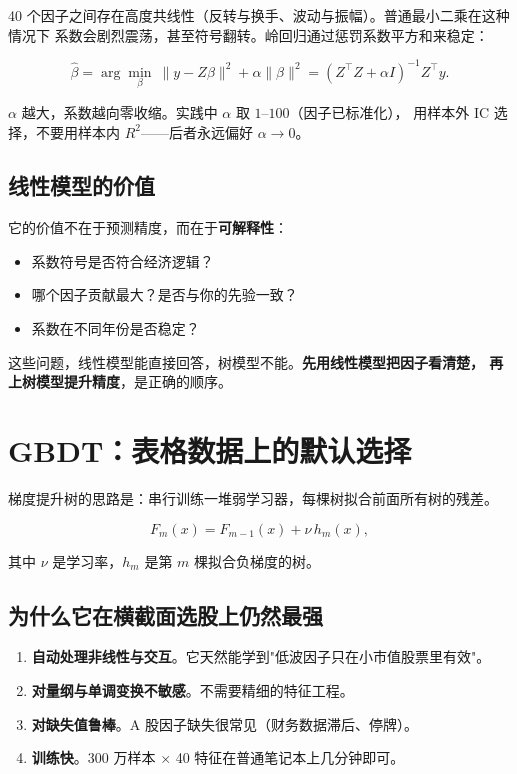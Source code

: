 40 个因子之间存在高度共线性（反转与换手、波动与振幅）。普通最小二乘在这种情况下
系数会剧烈震荡，甚至符号翻转。岭回归通过惩罚系数平方和来稳定：

\begin{equation}
  \hat\beta = \arg\min_{\beta}\ \|y - Z\beta\|^2 + \alpha\|\beta\|^2
  = (Z^\top Z + \alpha I)^{-1}Z^\top y.
\end{equation}

$\alpha$ 越大，系数越向零收缩。实践中 $\alpha$ 取 $1$--$100$（因子已标准化），
用样本外 IC 选择，不要用样本内 $R^2$——后者永远偏好 $\alpha\to 0$。

\subsection{线性模型的价值}

它的价值不在于预测精度，而在于\textbf{可解释性}：

\begin{itemize}
  \item 系数符号是否符合经济逻辑？
  \item 哪个因子贡献最大？是否与你的先验一致？
  \item 系数在不同年份是否稳定？
\end{itemize}

这些问题，线性模型能直接回答，树模型不能。\textbf{先用线性模型把因子看清楚，
再上树模型提升精度}，是正确的顺序。

\section{GBDT：表格数据上的默认选择}

梯度提升树的思路是：串行训练一堆弱学习器，每棵树拟合前面所有树的残差。

\begin{equation}
  F_m(x) = F_{m-1}(x) + \nu\, h_m(x),
\end{equation}

其中 $\nu$ 是学习率，$h_m$ 是第 $m$ 棵拟合负梯度的树。

\subsection{为什么它在横截面选股上仍然最强}

\begin{enumerate}
  \item \textbf{自动处理非线性与交互}。它天然能学到"低波因子只在小市值股票里有效"。
  \item \textbf{对量纲与单调变换不敏感}。不需要精细的特征工程。
  \item \textbf{对缺失值鲁棒}。A 股因子缺失很常见（财务数据滞后、停牌）。
  \item \textbf{训练快}。300 万样本 $\times$ 40 特征在普通笔记本上几分钟即可。
\end{enumerate}

